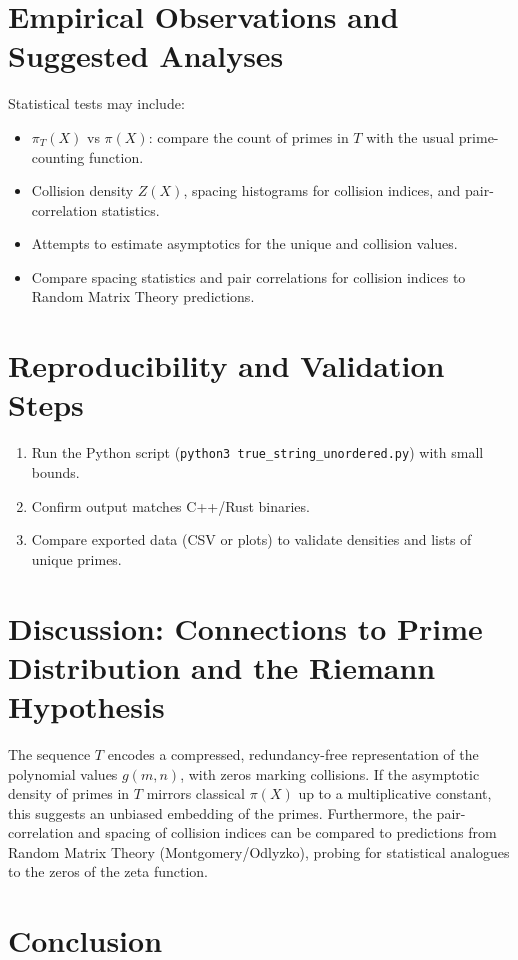 \documentclass[12pt]{article}
\theoremstyle{definition}
\theoremstyle{plain}
\begin{document}
\section{Empirical Observations and Suggested Analyses}
\label{sec:empirical}

Statistical tests may include:
\begin{itemize}
  \item \(\pi_T(X)\) vs \(\pi(X)\): compare the count of primes in \(T\) with the usual prime-counting function.
  \item Collision density \(Z(X)\), spacing histograms for collision indices, and pair-correlation statistics.
  \item Attempts to estimate asymptotics for the unique and collision values.
  \item Compare spacing statistics and pair correlations for collision indices to Random Matrix Theory predictions.
\end{itemize}

\section{Reproducibility and Validation Steps}
\begin{enumerate}
  \item Run the Python script (\texttt{python3 true\_string\_unordered.py}) with small bounds.
  \item Confirm output matches C++/Rust binaries.
  \item Compare exported data (CSV or plots) to validate densities and lists of unique primes.
\end{enumerate}

\section{Discussion: Connections to Prime Distribution and the Riemann Hypothesis}

The sequence \(T\) encodes a compressed, redundancy-free representation of the polynomial values \(g(m,n)\), with zeros marking collisions. If the asymptotic density of primes in \(T\) mirrors classical \(\pi(X)\) up to a multiplicative constant, this suggests an unbiased embedding of the primes. Furthermore, the pair-correlation and spacing of collision indices can be compared to predictions from Random Matrix Theory (Montgomery/Odlyzko), probing for statistical analogues to the zeros of the zeta function.

\section{Conclusion}
\end{document}
